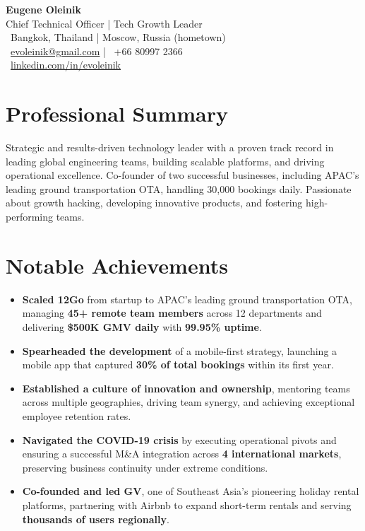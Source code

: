 \documentclass[11pt,a4paper]{article}
\begin{document}
\begin{center}
    \colorbox{headerbg}{\parbox{\textwidth}{
        \vspace{0.5em}
        {\Huge\textbf{Eugene Oleinik}} \\[0.3em]
        {\Large\color{secondarycolor} Chief Technical Officer | Tech Growth Leader} \\[0.5em]
        {\color{secondarycolor}
        \faMapMarker \, Bangkok, Thailand | Moscow, Russia (hometown) \\[0.2em]
        \faEnvelope \, \href{mailto:evoleinik@gmail.com}{evoleinik@gmail.com} | \faPhone \, +66 80997 2366 \\[0.2em]
        \faLinkedin \, \href{http://linkedin.com/in/evoleinik}{linkedin.com/in/evoleinik}}
        \vspace{0.5em}
    }}
\end{center}


\section*{Professional Summary}
{
Strategic and results-driven technology leader with a proven track record in leading global engineering teams, building scalable platforms, and driving operational excellence. Co-founder of two successful businesses, including APAC's leading ground transportation OTA, handling 30,000 bookings daily. Passionate about growth hacking, developing innovative products, and fostering high-performing teams.}

\section*{Notable Achievements}
\begin{itemize}
    \item \textbf{Scaled 12Go} from startup to APAC's leading ground transportation OTA, managing \textbf{45+ remote team members} across 12 departments and delivering \textbf{\$500K GMV daily} with \textbf{99.95\% uptime}.
    \item \textbf{Spearheaded the development} of a mobile-first strategy, launching a mobile app that captured \textbf{30\% of total bookings} within its first year.
    \item \textbf{Established a culture of innovation and ownership}, mentoring teams across multiple geographies, driving team synergy, and achieving exceptional employee retention rates.
    \item \textbf{Navigated the COVID-19 crisis} by executing operational pivots and ensuring a successful M\&A integration across \textbf{4 international markets}, preserving business continuity under extreme conditions.
    \item \textbf{Co-founded and led GV}, one of Southeast Asia's pioneering holiday rental platforms, partnering with Airbnb to expand short-term rentals and serving \textbf{thousands of users regionally}.
\end{itemize}
\end{document}
